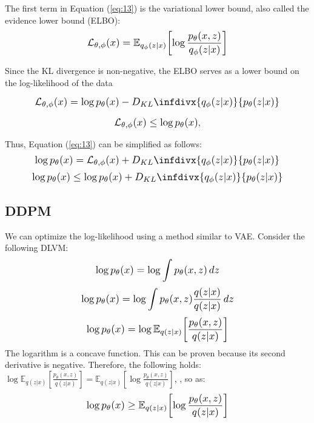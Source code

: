 \documentclass{article}
\newcommand{\infdiv}{D_{KL}\infdivx}
\newcommand*{\Scale}[2][4]{\scalebox{#1}{\ensuremath{#2}}}
\begin{document}
The first term in Equation (\ref{eq:13}) is the variational lower bound, also called the evidence lower bound (ELBO):
\begin{equation}
\Scale[1.2]{ \displaystyle \mathcal{L}_{\theta,\phi}(x) = \mathbb{E}_{q_\phi(z|x)} \left[ \log \frac{p_\theta(x,z)}{q_\phi(z|x)} \right] }
\end{equation}

Since the KL divergence is non-negative, the ELBO serves as a lower bound on the log-likelihood of the data

\begin{equation}
\Scale[1.2]{ \displaystyle \mathcal{L}_{\theta,\phi}(x) = \log p_\theta(x) -  \infdiv{q_\phi(z|x)}{p_\theta(z|x)}}
\end{equation}

\begin{equation}
\Scale[1.2]{ \displaystyle \mathcal{L}_{\theta,\phi}(x) \leq \log p_\theta(x) },
\end{equation}

Thus, Equation (\ref{eq:13}) can be simplified as follows:
\begin{equation}
\Scale[1.2]{\displaystyle \log p_\theta(x) = 
\mathcal{L}_{\theta,\phi}(x)
+
 \infdiv{q_\phi(z|x)}{p_\theta(z|x)}
}
\end{equation}
\begin{equation}
\Scale[1.2]{\displaystyle \log p_\theta(x) \leq 
\log p_\theta(x)
+
 \infdiv{q_\phi(z|x)}{p_\theta(z|x)}
}
\end{equation}


\subsection{DDPM}


We can optimize the log-likelihood using a method similar to VAE. Consider the following DLVM:
\begin{equation}
\Scale[1.2]{ \displaystyle \log p_\theta(x) = \log \int p_\theta(x,z) \,dz }
\end{equation}
\begin{equation}
\Scale[1.2]{ \displaystyle \log p_\theta(x) = \log \int p_\theta(x,z) \frac{q(z|x)}{q(z|x)} \,dz }
\end{equation}
\begin{equation}
\Scale[1.2]{ \displaystyle \log p_\theta(x) = \log \mathbb{E}_{q(z|x)} \left[ \frac{p_\theta(x,z)}{q(z|x)} \right] }
\end{equation}
The logarithm is a concave function. This can be proven because its second derivative is negative. Therefore, the following holds: $ \log \mathbb{E}_{q(z|x)} \left[ \frac{p_\theta(x,z)}{q(z|x)} \right] = \mathbb{E}_{q(z|x)} \left[ \log \frac{p_\theta(x,z)}{q(z|x)} \right] $, , so as:
\begin{equation}
\Scale[1.2]{ \displaystyle \log p_\theta(x) \geq \mathbb{E}_{q(z|x)} \left[\log \frac{p_\theta(x,z)}{q(z|x)} \right] }
\end{equation}
\end{document}
